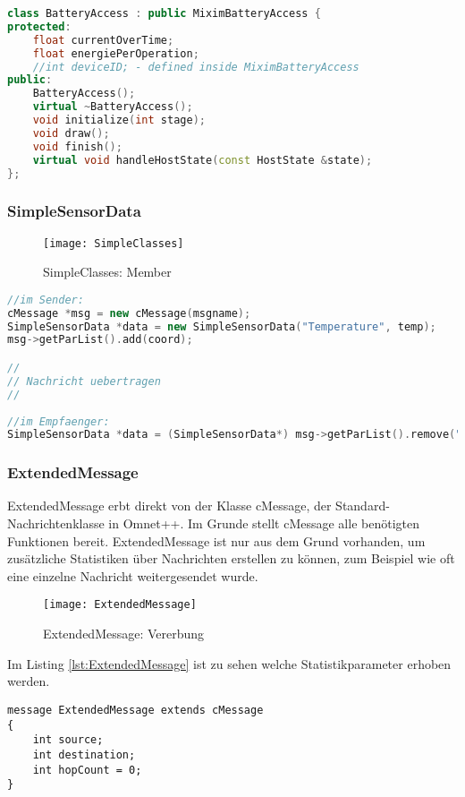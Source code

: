 \begin{lstlisting}[language=C++, label=lst:BatteryAccess]
class BatteryAccess : public MiximBatteryAccess {
protected:
    float currentOverTime;
    float energiePerOperation;
    //int deviceID; - defined inside MiximBatteryAccess
public:
    BatteryAccess();
    virtual ~BatteryAccess();
    void initialize(int stage);
    void draw();
    void finish();
    virtual void handleHostState(const HostState &state);
};
\end{lstlisting}

\subsubsection{SimpleSensorData}

\begin{figure}[htbp]
\centering
\caption{SimpleClasses: Member}
\texttt{[image: SimpleClasses]}
\end{figure}

\begin{lstlisting}[language=C++, label=lst:SimpleExample]
//im Sender:
cMessage *msg = new cMessage(msgname);
SimpleSensorData *data = new SimpleSensorData("Temperature", temp);
msg->getParList().add(coord);

//
// Nachricht uebertragen    
//  
  
//im Empfaenger:  
SimpleSensorData *data = (SimpleSensorData*) msg->getParList().remove("Temperature");
\end{lstlisting}

\subsubsection{ExtendedMessage}

ExtendedMessage erbt direkt von der Klasse cMessage, der Standard-Nachrichtenklasse in Omnet++. Im Grunde stellt cMessage alle benötigten Funktionen bereit. ExtendedMessage ist nur aus dem Grund vorhanden, um zusätzliche Statistiken über Nachrichten erstellen zu können, zum Beispiel wie oft eine einzelne Nachricht weitergesendet wurde.

\begin{figure}[htbp]
\centering
\caption{ExtendedMessage: Vererbung}
\texttt{[image: ExtendedMessage]}
\end{figure}

Im Listing \ref{lst:ExtendedMessage} ist zu sehen welche Statistikparameter erhoben werden.

\begin{minipage}{\textwidth}
\begin{lstlisting}[language=NED, label=lst:ExtendedMessage]
message ExtendedMessage extends cMessage
{
    int source;
    int destination;
    int hopCount = 0;    
}
\end{lstlisting}
\end{minipage}

